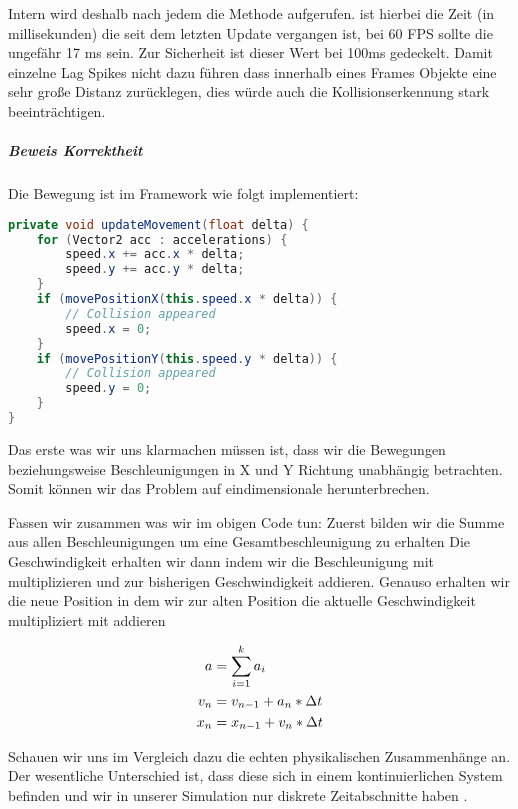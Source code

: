 Intern wird deshalb nach jedem  die Methode  aufgerufen.  ist hierbei die Zeit (in millisekunden) die seit dem letzten Update vergangen ist, bei 60 FPS sollte die ungefähr 17 ms sein. Zur Sicherheit ist dieser Wert bei 100ms gedeckelt. Damit einzelne Lag Spikes nicht dazu führen dass innerhalb eines Frames Objekte eine sehr große Distanz zurücklegen, dies würde auch die Kollisionserkennung stark beeinträchtigen.

\subparagraph{Beweis Korrektheit}

Die Bewegung ist im Framework wie folgt implementiert:

\doinline
\begin{lstlisting}[caption=Framerate unabhängiges bewegen eines Entities, title=\hspace{0 pt}, language=java]
private void updateMovement(float delta) {
	for (Vector2 acc : accelerations) {
		speed.x += acc.x * delta;
		speed.y += acc.y * delta;
	}
	if (movePositionX(this.speed.x * delta)) {
		// Collision appeared
		speed.x = 0;
	}
	if (movePositionY(this.speed.y * delta)) {
		// Collision appeared
		speed.y = 0;
	}
}
\end{lstlisting}

Das erste was wir uns klarmachen müssen ist, dass wir die Bewegungen beziehungsweise Beschleunigungen in X und Y Richtung unabhängig betrachten. Somit können wir das Problem auf eindimensionale herunterbrechen.

Fassen wir zusammen was wir im obigen Code tun:
Zuerst bilden wir die Summe aus allen Beschleunigungen um eine Gesamtbeschleunigung zu erhalten
Die Geschwindigkeit erhalten wir dann indem wir die Beschleunigung mit  multiplizieren und zur bisherigen Geschwindigkeit addieren.
Genauso erhalten wir die neue Position in dem wir zur alten Position die aktuelle Geschwindigkeit multipliziert mit  addieren

\begin{align*}
    a &= \sum_{i=1}^{k}{a_i}  \\
  v_n &= v_{n-1} + a_n * \Delta t  \\
  x_n &= x_{n-1} + v_n * \Delta t
\end{align*}

Schauen wir uns im Vergleich dazu die echten physikalischen Zusammenhänge an. Der wesentliche Unterschied ist, dass diese sich in einem kontinuierlichen System befinden und wir in unserer Simulation nur diskrete Zeitabschnitte haben .

